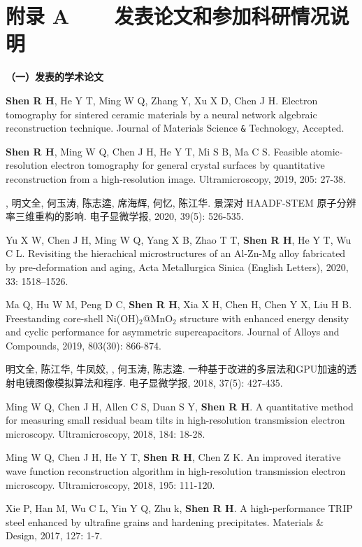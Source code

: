 \clearemptydoublepage
{}
\vspace{0cm}
\chapter*{附录 A~~~~发表论文和参加科研情况说明}
\vspace{0cm}
\setlength{\parindent}{0em}
\textbf{（一）发表的学术论文}
\begin{publist}
\item \textbf{Shen R H}, He Y T, Ming W Q, Zhang Y, Xu X D, Chen J H. Electron tomography for sintered ceramic materials by a neural network algebraic reconstruction technique. Journal of Materials Science \verb'&' Technology, Accepted. 
\item \textbf{Shen R H}, Ming W Q, Chen J H, He Y T, Mi S B, Ma C S. Feasible atomic-resolution electron tomography for general crystal surfaces by quantitative reconstruction from a high-resolution image. Ultramicroscopy, 2019, 205: 27-38. 
\item {}\song, 明文全, 何玉涛, 陈志逵, 席海辉, 何忆, 陈江华. 景深对 HAADF-STEM 原子分辨率三维重构的影响. 电子显微学报, 2020, 39(5): 526-535. 
\item Yu X W, Chen J H, Ming W Q, Yang X B, Zhao T T, \textbf{Shen R H}, He Y T, Wu C L. Revisiting the hierachical microstructures of an Al-Zn-Mg alloy fabricated by pre-deformation and aging, Acta Metallurgica Sinica (English Letters), 2020, 33: 1518–1526. 
\item Ma Q, Hu W M, Peng D C, \textbf{Shen R H}, Xia X H, Chen H, Chen Y X, Liu H B. Freestanding core-shell Ni(OH)$_2$@MnO$_2$ structure with enhanced energy density and cyclic performance for asymmetric supercapacitors. Journal of Alloys and Compounds, 2019, 803(30): 866-874. 
\item 明文全, 陈江华, 牛凤姣, \song, 何玉涛, 陈志逵. 一种基于改进的多层法和GPU加速的透射电镜图像模拟算法和程序. 电子显微学报, 2018, 37(5): 427-435.
\item Ming W Q, Chen J H, Allen C S, Duan S Y, \textbf{Shen R H}. A quantitative method for measuring small residual beam tilts in high-resolution transmission electron microscopy. Ultramicroscopy, 2018, 184: 18-28.
\item Ming W Q, Chen J H, He Y T, \textbf{Shen R H}, Chen Z K. An improved iterative wave function reconstruction algorithm in high-resolution transmission electron microscopy. Ultramicroscopy, 2018, 195: 111-120.
\item Xie P, Han M, Wu C L, Yin Y Q, Zhu k, \textbf{Shen R H}. A high-performance TRIP steel enhanced by ultrafine grains and hardening precipitates. Materials \& Design, 2017, 127: 1-7.

\end{publist}

